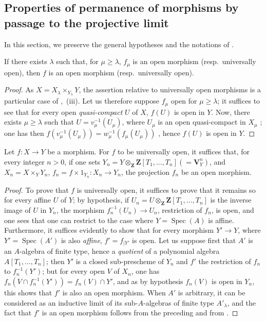 \subsection{Properties of permanence of morphisms by passage to the projective limit}
\label{subsection:IV.8.10}

In this section, we preserve the general hypotheses and the notations of .

\begin{proposition}[8.10.1]
\label{IV.8.10.1}
If there exists $\lambda$ such that, for $\mu\geqslant\lambda$, $f_\mu$ is an open morphism (resp.\ universally open), then $f$ is an open morphism (resp.\ universally open).
\end{proposition}

\begin{proof}
As $X=X_\lambda\times_{Y_\lambda}Y$, the assertion relative to universally open morphisms is a particular case of ,~(iii).
Let us therefore suppose $f_\mu$ open for $\mu\geqslant\lambda$; it suffices to see that for every open \emph{quasi-compact} $U$ of $X$, $f(U)$ is open in $Y$.
Now, there exists $\mu\geqslant\lambda$ such that $U=v_\mu^{-1}(U_\mu)$, where $U_\mu$ is an open quasi-compact in $X_\mu$ ; one has then $f(v_\mu^{-1}(U_\mu))=w_\mu^{-1}(f_\mu(U_\mu))$ , hence $f(U)$ is open in $Y$.
\end{proof}

\begin{corollary}[8.10.2]
\label{IV.8.10.2}
Let $f:X\to Y$ be a morphism.
For $f$ to be universally open, it suffices that, for every integer $n>0$, if one sets $Y_n=Y\otimes_\mathbf{Z}\mathbf{Z}[T_1,\ldots,T_n](=\mathbf{V}_Y^n)$, and $X_n=X\times_Y Y_n$, $f_n=f\times 1_{Y_n}:X_n\to Y_n$, the projection $f_n$ be an open morphism.
\end{corollary}

\begin{proof}
To prove that $f$ is universally open, it suffices to prove that it remains so for every affine $U$ of $Y$; by hypothesis, if $U_n=U\otimes_\mathbf{Z}\mathbf{Z}[T_1,\ldots,T_n]$ is the inverse image of $U$ in $Y_n$, the morphism $f_n^{-1}(U_n)\to U_n$, restriction of $f_n$, is open, and one sees that one can restrict to the case where $Y=\operatorname{Spec}(A)$ is affine.
Furthermore, it suffices evidently to show that for every morphism $Y'\to Y$, where $Y'=\operatorname{Spec}(A')$ is also \emph{affine}, $f'=f_{|Y'}$ is open.
Let us suppose first that $A'$ is an $A$-algebra of finite type, hence a \emph{quotient} of a polynomial algebra $A[T_1,\ldots,T_n]$; then $Y'$ is a closed sub-prescheme of $Y_n$ and $f'$ the restriction
of $f_n$ to $f_n^{-1}(Y')$; but for every open $V$ of $X_n$, one has $f_n(V\cap f_n^{-1}(Y'))=f_n(V)\cap Y'$, and as by hypothesis $f_n(V)$ is open in $Y_n$, this shows that $f'$ is also an open morphism.
When $A'$ is arbitrary, it can be considered as an inductive limit of its sub-$A$-algebras of finite type $A'_\lambda$, and the fact that $f'$ is an open morphism follows from the preceding and from .
\end{proof}

